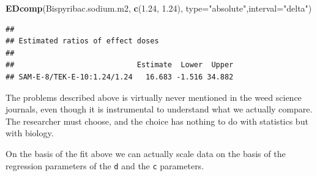 \documentclass[letterpaper,]{book}
\newenvironment{Shaded}{\begin{snugshade}}{\end{snugshade}}
\newcommand{\DataTypeTok}[1]{\textcolor[rgb]{0.13,0.29,0.53}{#1}}
\newcommand{\FloatTok}[1]{\textcolor[rgb]{0.00,0.00,0.81}{#1}}
\newcommand{\KeywordTok}[1]{\textcolor[rgb]{0.13,0.29,0.53}{\textbf{#1}}}
\newcommand{\NormalTok}[1]{#1}
\newcommand{\StringTok}[1]{\textcolor[rgb]{0.31,0.60,0.02}{#1}}
\begin{document}
\begin{Shaded}
\begin{Highlighting}[]
\KeywordTok{EDcomp}\NormalTok{(Bispyribac.sodium.m2, }\KeywordTok{c}\NormalTok{(}\FloatTok{1.24}\NormalTok{, }\FloatTok{1.24}\NormalTok{), }\DataTypeTok{type=}\StringTok{"absolute"}\NormalTok{,}\DataTypeTok{interval=}\StringTok{"delta"}\NormalTok{)}
\end{Highlighting}
\end{Shaded}

\begin{verbatim}
## 
## Estimated ratios of effect doses
## 
##                            Estimate  Lower  Upper
## SAM-E-8/TEK-E-10:1.24/1.24   16.683 -1.516 34.882
\end{verbatim}

The problems described above is virtually never mentioned in the weed science journals, even though it is instrumental to understand what we actually compare. The researcher must choose, and the choice has nothing to do with statistics but with biology.

On the basis of the fit above we can actually scale data on the basis of the regression parameters of the \texttt{d} and the \texttt{c} parameters.
\end{document}
